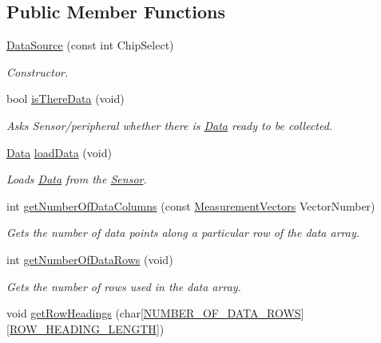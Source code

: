 \subsection*{Public Member Functions}
\begin{DoxyCompactItemize}
\item 
\mbox{\hyperlink{class_data_source_a9c3258c608e4fdf9436e8cd32d677e7d}{Data\+Source}} (const int Chip\+Select)
\begin{DoxyCompactList}\small\item\em Constructor. \end{DoxyCompactList}\item 
bool \mbox{\hyperlink{class_data_source_a7d92295e088894b5417729a814e49e01}{is\+There\+Data}} (void)
\begin{DoxyCompactList}\small\item\em Asks Sensor/peripheral whether there is \mbox{\hyperlink{struct_data}{Data}} ready to be collected. \end{DoxyCompactList}\item 
\mbox{\hyperlink{struct_data}{Data}} \mbox{\hyperlink{class_data_source_a81aac807bfb601c2ac1da78f69d31d48}{load\+Data}} (void)
\begin{DoxyCompactList}\small\item\em Loads \mbox{\hyperlink{struct_data}{Data}} from the \mbox{\hyperlink{class_sensor}{Sensor}}. \end{DoxyCompactList}\item 
int \mbox{\hyperlink{class_data_source_ac15f241362d7c22c75c42c2bb16315bf}{get\+Number\+Of\+Data\+Columns}} (const \mbox{\hyperlink{_s_p_i___instruction_set_8h_a9d8048399836e11887f85cc8dc3d75d5}{Measurement\+Vectors}} Vector\+Number)
\begin{DoxyCompactList}\small\item\em Gets the number of data points along a particular row of the data array. \end{DoxyCompactList}\item 
int \mbox{\hyperlink{class_data_source_a52269fa43b741f1ab431aac56d3aedb5}{get\+Number\+Of\+Data\+Rows}} (void)
\begin{DoxyCompactList}\small\item\em Gets the number of rows used in the data array. \end{DoxyCompactList}\item 
void \mbox{\hyperlink{class_data_source_acdeb2ae03f2c70d19565381d111a1a4d}{get\+Row\+Headings}} (char\mbox{[}\mbox{\hyperlink{_s_p_i___instruction_set_8h_a030a0b94acdc35db8cf20a5044a1c775}{N\+U\+M\+B\+E\+R\+\_\+\+O\+F\+\_\+\+D\+A\+T\+A\+\_\+\+R\+O\+WS}}\mbox{]}\mbox{[}\mbox{\hyperlink{_s_p_i___instruction_set_8h_a63a97a0fe356d1b3030dfb633e0d0b8e}{R\+O\+W\+\_\+\+H\+E\+A\+D\+I\+N\+G\+\_\+\+L\+E\+N\+G\+TH}}\mbox{]})

\end{DoxyCompactItemize}

